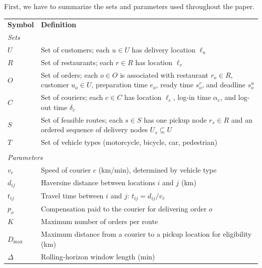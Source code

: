 \documentclass[runningheads]{llncs}
\begin{document}
First, we have to summarize the sets and parameters used throughout the paper.
\setlength{\textfloatsep}{5pt}
\setlength{\intextsep}{5pt}

\begin{table}[ht]
\centering
\label{tab:notation}
\small
\setlength{\tabcolsep}{5pt}
\begin{tabular}{lp{10.5cm}}
\textbf{Symbol} & \textbf{Definition} \\
\multicolumn{2}{l}{\textit{Sets}} \\
$U$   & Set of customers; each $u \in U$ has delivery location $\ell_u$ \\
$R$   & Set of restaurants; each $r \in R$ has location $\ell_r$ \\
$O$   & Set of orders; each $o \in O$ is associated with restaurant $r_o \in R$,
        customer $u_o \in U$, preparation time $e_o$, ready time $s^r_o$,
        and deadline $s^u_o$ \\
$C$   & Set of couriers; each $c \in C$ has location $\ell_c$,
        log-in time $\alpha_c$, and log-out time $\delta_c$ \\
$S$   & Set of feasible routes; each $s \in S$ has one pickup node
        $r_s \in R$ and an ordered sequence of delivery nodes
        $U_s \subseteq U$ \\
$T$   & Set of vehicle types
        (motorcycle, bicycle, car, pedestrian) \\
\\

\multicolumn{2}{l}{\textit{Parameters}} \\
$v_c$             & Speed of courier $c$ (km/min), determined by vehicle type \\
$d_{ij}$          & Haversine distance between locations $i$ and $j$ (km) \\
$t_{ij}$          & Travel time between $i$ and $j$: $t_{ij} = d_{ij}/v_c$ \\
$p_o$             & Compensation paid to the courier for delivering order $o$ \\
$K$               & Maximum number of orders per route \\
$D_{\max}$        & Maximum distance from a courier to a pickup location for
                    eligibility (km) \\
$\Delta$          & Rolling-horizon window length (min) \\
\end{tabular}
\end{table}
\end{document}
